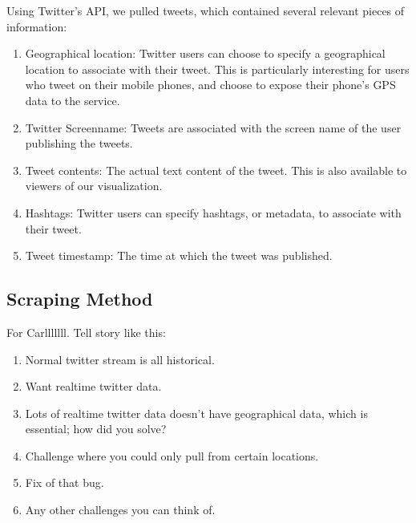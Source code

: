 \documentclass[pdftex,12pt,a4paper]{article}
\begin{document}
Using Twitter's API, we pulled tweets, which contained several relevant pieces of information:
\begin{enumerate}
\item Geographical location: Twitter users can choose to specify a geographical location to associate with their tweet. This is particularly interesting for users who tweet on their mobile phones, and choose to expose their phone's GPS data to the service.
\item Twitter Screenname: Tweets are associated with the screen name of the user publishing the tweets.
\item Tweet contents: The actual text content of the tweet. This is also available to viewers of our visualization.
\item Hashtags: Twitter users can specify hashtags, or metadata, to associate with their tweet. 
\item Tweet timestamp: The time at which the tweet was published.
\end{enumerate}

\subsection{Scraping Method}
For Carlllllll. Tell story like this:
\begin{enumerate}
\item Normal twitter stream is all historical.
\item Want realtime twitter data.
\item Lots of realtime twitter data doesn't have geographical data, which is essential; how did you solve?
\item Challenge where you could only pull from certain locations.
\item Fix of that bug.
\item Any other challenges you can think of.
\end{enumerate}
\end{document}

